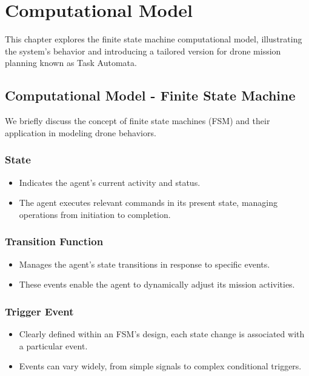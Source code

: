 \chapter{Computational Model}
\label{sec:ComputationalModel}

This chapter explores the finite state machine computational model, illustrating the system's behavior and introducing a tailored version for drone mission planning known as Task Automata.

\section{Computational Model - Finite State Machine}
We briefly discuss the concept of finite state machines (FSM) and their application in modeling drone behaviors.

\subsection{State}
\begin{itemize}
    \item Indicates the agent's current activity and status.
    \item The agent executes relevant commands in its present state, managing operations from initiation to completion.
\end{itemize}

\subsection{Transition Function}
\begin{itemize}
    \item Manages the agent's state transitions in response to specific events.
    \item These events enable the agent to dynamically adjust its mission activities.
\end{itemize}

\subsection{Trigger Event}
\begin{itemize}
    \item Clearly defined within an FSM's design, each state change is associated with a particular event.
    \item Events can vary widely, from simple signals to complex conditional triggers.
\end{itemize}


